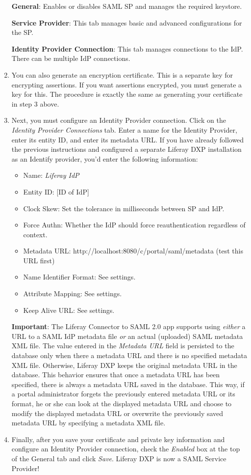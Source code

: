\begin{enumerate}
  \textbf{General}: Enables or disables SAML SP and manages the required
  keystore.

  \textbf{Service Provider}: This tab manages basic and advanced
  configurations for the SP.

  \textbf{Identity Provider Connection}: This tab manages connections to
  the IdP. There can be multiple IdP connections.
\item
  You can also generate an encryption certificate. This is a separate
  key for encrypting assertions. If you want assertions encrypted, you
  must generate a key for this. The procedure is exactly the same as
  generating your certificate in step 3 above.
\item
  Next, you must configure an Identity Provider connection. Click on the
  \emph{Identity Provider Connections} tab. Enter a name for the
  Identity Provider, enter its entity ID, and enter its metadata URL. If
  you have already followed the previous instructions and configured a
  separate Liferay DXP installation as an Identify provider, you'd enter
  the following information:

  \begin{itemize}
  \tightlist
  \item
    Name: \emph{Liferay IdP}
  \item
    Entity ID: {[}ID of IdP{]}
  \item
    Clock Skew: Set the tolerance in milliseconds between SP and IdP.
  \item
    Force Authn: Whether the IdP should force reauthentication
    regardless of context.
  \item
    Metadata URL: http://localhost:8080/c/portal/saml/metadata (test
    this URL first)
  \item
    Name Identifier Format: See settings.
  \item
    Attribute Mapping: See settings.
  \item
    Keep Alive URL: See settings.
  \end{itemize}

  \textbf{Important}: The Liferay Connector to SAML 2.0 app supports
  using \emph{either} a URL to a SAML IdP metadata file \emph{or} an
  actual (uploaded) SAML metadata XML file. The value entered in the
  \emph{Metadata URL} field is persisted to the database only when there
  a metadata URL and there is no specified metadata XML file. Otherwise,
  Liferay DXP keeps the original metadata URL in the database. This
  behavior ensures that once a metadata URL has been specified, there is
  always a metadata URL saved in the database. This way, if a portal
  administrator forgets the previously entered metadata URL or its
  format, he or she can look at the displayed metadata URL and choose to
  modify the displayed metadata URL or overwrite the previously saved
  metadata URL by specifying a metadata XML file.
\item
  Finally, after you save your certificate and private key information
  and configure an Identity Provider connection, check the
  \emph{Enabled} box at the top of the General tab and click
  \emph{Save}. Liferay DXP is now a SAML Service Provider!
\end{enumerate}

